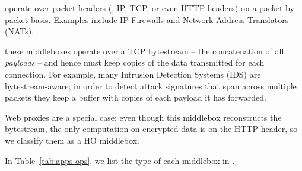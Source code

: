  operate over packet headers (\eg{}, IP, TCP, or even HTTP headers) on a packet-by-packet basis.
Examples  include IP Firewalls and Network Address Translators (NATs). 

 these middleboxes operate over a TCP bytestream -- the concatenation of all {\it payloads} -- and hence must keep copies of the data transmitted for each connection.
  For example, many Intrusion Detection Systems (IDS) are bytestream-aware; in order to detect attack signatures that span across multiple packets they keep a buffer  with copies of each payload it has forwarded.


 Web proxies are a special case: even though this middlebox reconstructs the bytestream, the only computation on encrypted data is on the HTTP header, so we classify them as a HO middlebox. 
 
  
 
 

 
 
  In Table~\ref{tab:apps-ops}, we list the type of each  middlebox in \sys. 
  
